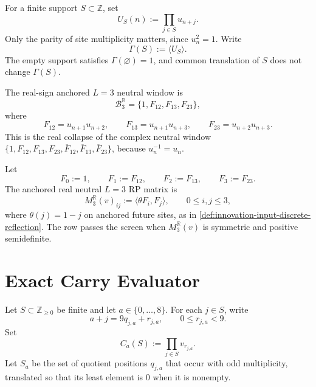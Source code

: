 \begin{definition}
\label{def:innovation-input-real-sign-support-block}
For a finite support $S\subset\mathbb Z$, set
$$
U_S(n):=\prod_{j\in S}u_{n+j}.
$$
Only the parity of site multiplicity matters, since $u_n^2=1$. Write
$$
\Gamma(S):=\langle U_S\rangle.
$$
The empty support satisfies $\Gamma(\varnothing)=1$, and common
translation of $S$ does not change $\Gamma(S)$.
\end{definition}

\begin{definition}[Anchored real $L=3$ neutral window]
\label{def:innovation-input-nine-real-lthree-window}
The real-sign anchored $L=3$ neutral window is
$$
\mathcal B_3^{\mathbb R}
=
\{1,F_{12},F_{13},F_{23}\},
$$
where
$$
F_{12}=u_{n+1}u_{n+2},
\qquad
F_{13}=u_{n+1}u_{n+3},
\qquad
F_{23}=u_{n+2}u_{n+3}.
$$
This is the real collapse of the complex neutral window
$\{1,F_{12},F_{13},F_{23},\overline F_{12},\overline F_{13},
\overline F_{23}\}$, because $u_n^{-1}=u_n$.
\end{definition}

\begin{definition}
\label{def:innovation-input-nine-real-rp-matrix}
Let
$$
F_0:=1,
\qquad
F_1:=F_{12},
\qquad
F_2:=F_{13},
\qquad
F_3:=F_{23}.
$$
The anchored real neutral $L=3$ RP matrix is
$$
M_3^{\mathbb R}(v)_{ij}:=\langle\theta F_i,F_j\rangle,
\qquad
0\le i,j\le3,
$$
where $\theta(j)=1-j$ on anchored future sites, as in
\autoref{def:innovation-input-discrete-reflection}. The row passes the
screen when $M_3^{\mathbb R}(v)$ is symmetric and positive semidefinite.
\end{definition}

\section{Exact Carry Evaluator}
\label{sec:innovation-input-nine-real-carry-evaluator}

\begin{definition}
\label{def:innovation-input-nine-carry-branch}
Let $S\subset\mathbb Z_{\ge0}$ be finite and let $a\in\{0,\ldots,8\}$.
For each $j\in S$, write
$$
a+j=9q_{j,a}+r_{j,a},
\qquad
0\le r_{j,a}<9.
$$
Set
$$
C_a(S):=\prod_{j\in S}v_{r_{j,a}}.
$$
Let $S_a$ be the set of quotient positions $q_{j,a}$ that occur with odd
multiplicity, translated so that its least element is $0$ when it is
nonempty.
\end{definition}

